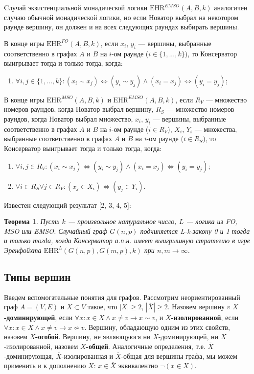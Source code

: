 \documentclass{article}
\newtheorem*{thm}{Теорема}
\begin{document}
	Cлучай экзистенциальной монадической логики $\textrm{EHR}^{EMSO}(A, B, k)$ аналогичен случаю обычной монадической логики, но если Новатор выбрал на некотором раунде вершину, он должен и на всех следующих раундах выбирать вершины.
	
	В конце игры $\textrm{EHR}^{FO}(A, B, k)$, если $x_i$, $y_i$ --- вершины, выбранные соответственно в графах $A$ и $B$ на $i$-ом раунде ($i \in \{1, ..., k\}$), то Консерватор выигрывает тогда и только тогда, когда:
	
	\begin{enumerate}
		\item $\forall i, j \in \{1, ..., k\}: (x_i \sim x_j) \Leftrightarrow (y_i \sim y_j) \land (x_i = x_j) \Leftrightarrow (y_i = y_j);$
	\end{enumerate}
	
	В конце игры $\textrm{EHR}^{MSO}(A, B, k)$ и $\textrm{EHR}^{EMSO}(A, B, k)$,  если $R_{V}$ --- множество номеров раундов, когда Новатор выбрал вершину, $R_{S}$ --- множество номеров раундов, когда Новатор выбрал  множество, $x_i$, $y_i$ --- вершины, выбранные соответственно в графах $A$ и $B$ на $i$-ом раунде ($i \in R_{V}$),  $X_i$, $Y_i$ --- множества, выбранные соответственно в графах $A$ и $B$ на $i$-ом раунде ($i \in R_{S}$), то Консерватор выигрывает тогда и только тогда, когда:
	
	\begin{enumerate}
		\item $\forall i, j \in R_{V}: (x_i \sim x_j) \Leftrightarrow (y_i \sim y_j) \land (x_i = x_j) \Leftrightarrow (y_i = y_j);$
		\item $\forall i \in R_{S} \forall j \in R_{V}: (x_j \in X_i) \Leftrightarrow (y_j \in Y_i).$
	\end{enumerate}
	
	Известен следующий результат [2, 3, 4, 5]:
	
	\begin{thm}
		Пусть $k$ --- произвольное натуральное число, $L$ --- логика из FO, MSO или EMSO. Случайный граф ${G}(n, p)$ подчиняется L-k-закону 0 и 1 тогда и только тогда, когда Консерватор а.п.н. имеет выигрышную стратегию в игре Эренфойхта $\textrm{EHR}^{L}({G}(n, p), {G}(m, p), k)$ при $n, m \to \infty$. 
	\end{thm}
	
	\subsection{Типы вершин}
	Введем вспомогательные понятия для графов. Рассмотрим неориентированный граф $A = (V, E)$ и $X \subset V$ такое, что $|X| \geq 2$, $|\overline{X}| \geq 2$. Назовем вершину $v$ \textbf{$X$-доминирующей}, если $\forall x: x \in X \land x \neq v \to x \sim v$, и \textbf{$X$-изолированной}, если $\forall x: x \in X \land x \neq v \to x \nsim v$. Вершину, обладающую одним из этих свойств, назовем \textbf{$X$-особой}. Вершину, не являющуюся ни $X$-доминирующей, ни $X$-изолированной, назовем \textbf{$X$-общей}. Аналогичные определения, т.е. $\overline{X}$-доминирующая, $\overline{X}$-изолированная и $\overline{X}$-общая для вершины графа, мы можем применить и к дополнению $X$: $x \in \overline{X}$ эквивалентно $\neg(x \in X)$.
	
\end{document}
